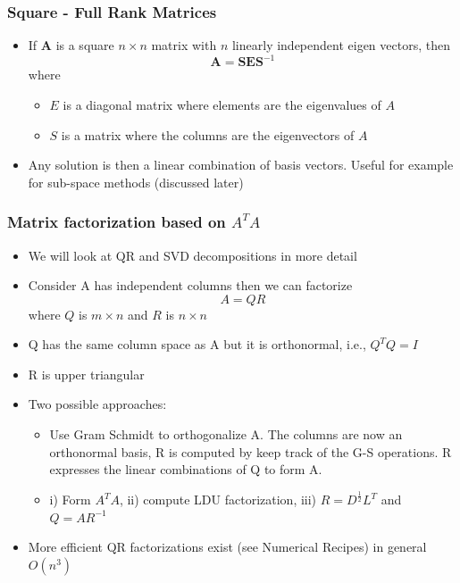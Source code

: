 \documentclass[10pt]{beamer}
\begin{document}
\begin{frame}
  \frametitle{Square - Full Rank Matrices}
  \begin{itemize}
  \item If $\mathbf{A}$ is a square $n \times n$ matrix with $n$ linearly independent eigen vectors, then
    \[
      \mathbf{A} = \mathbf{S} \mathbf{E} \mathbf{S}^{-1}
    \]
    where
    \begin{itemize}
    \item $E$ is a diagonal matrix where elements are the eigenvalues of $A$
    \item $S$ is a matrix where the columns are the eigenvectors of $A$
    \end{itemize}
  \item Any solution is then a linear combination of basis
    vectors. Useful for example for sub-space methods (discussed
    later)
  \end{itemize}
\end{frame}

\begin{frame}
  \frametitle{Matrix factorization based on $A^T A$}
  \begin{itemize}
  \item We will look at QR and SVD decompositions in more detail
  \item Consider A has independent columns then we can factorize
    \[
      A = QR
    \]
    where $Q$ is $m \times n$ and $R$ is $n \times n$
  \item Q has the same column space as A but it is orthonormal, i.e., $Q^T Q = I$ 
  \item R is upper triangular
  \item Two possible approaches:
    \begin{itemize}
    \item Use Gram Schmidt to orthogonalize A. The columns are now an orthonormal basis, R is computed by keep track of the G-S operations. R expresses the linear combinations of Q to form A. 
    \item i) Form $A^T A$, ii) compute LDU factorization, iii) $R = D^{\frac{1}{2}} L^T$ and $Q = A R^{-1}$
    \end{itemize}
  \item More efficient QR factorizations exist (see Numerical Recipes) in general $O(n^3)$
  \end{itemize}
\end{frame}
\end{document}
